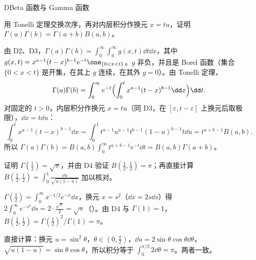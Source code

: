 \begin{probleme}[问题]{D}{Beta 函数与 Gamma 函数}
\begin{questions}
\item 用 Tonelli 定理交换次序，再对内层积分作换元 $x=tu$，证明 $\Gamma(a)\Gamma(b)=\Gamma(a+b)B(a,b)$。
\begin{solution}
由 D2、D3，$\Gamma(a)\Gamma(b)=\int_0^\infty\int_0^\infty g(x,t)\dd t\dd x$，其中 $g(x,t)=x^{a-1}(t-x)^{b-1}e^{-t}\one_{\{0<x<t\}}$。$g$ 非负，并且是 Borel 函数（集合 $\{0<x<t\}$ 是开集，在其上 $g$ 连续，在其外 $g=0$）。由 Tonelli 定理，
\[
\Gamma(a)\Gamma(b)=\int_0^\infty e^{-t}\Bigl(\int_0^tx^{a-1}(t-x)^{b-1}\dd x\Bigr)\dd t .
\]
对固定的 $t>0$，内层积分作换元 $x=tu$（同 D3，在 $[\varepsilon,t-\varepsilon]$ 上换元后取极限），$\dd x=t\dd u$：
\[
\int_0^tx^{a-1}(t-x)^{b-1}\dd x=\int_0^1t^{a-1}u^{a-1}t^{b-1}(1-u)^{b-1}t\dd u=t^{a+b-1}B(a,b).
\]
所以 $\Gamma(a)\Gamma(b)=B(a,b)\int_0^\infty t^{a+b-1}e^{-t}\dd t=B(a,b)\Gamma(a+b)$。
\end{solution}

\item 证明 $\Gamma(\frac12)=\sqrt\pi$，并由 D4 验证 $B(\frac12,\frac12)=\pi$；再直接计算 $B(\frac12,\frac12)=\int_0^1\frac{\dd u}{\sqrt{u(1-u)}}$ 加以核对。
\begin{solution}
$\Gamma(\frac12)=\int_0^\infty x^{-1/2}e^{-x}\dd x$，换元 $x=s^2$（$\dd x=2s\dd s$）得 $2\int_0^\infty e^{-s^2}\dd s=2\cdot\frac{\sqrt\pi}2=\sqrt\pi$（）。由 D4 与 $\Gamma(1)=1$，$B(\frac12,\frac12)=\Gamma(\frac12)^2/\Gamma(1)=\pi$。

直接计算：换元 $u=\sin^2\theta$，$\theta\in(0,\frac\pi2)$，$\dd u=2\sin\theta\cos\theta\dd\theta$，$\sqrt{u(1-u)}=\sin\theta\cos\theta$，所以积分等于 $\int_0^{\pi/2}2\dd\theta=\pi$。两者一致。
\end{solution}
\end{questions}
\end{probleme}


